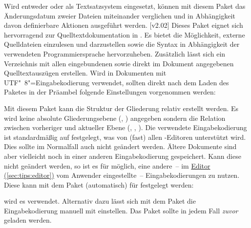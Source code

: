\begin{DeclarePackages}
  Wird entweder  oder  als Textsatzsystem 
  eingesetzt, können mit diesem Paket das Änderungsdatum zweier Dateien 
  miteinander verglichen und in Abhängigkeit davon definierbare Aktionen 
  ausgeführt werden.
[v2.02]
  Dieses Paket eignet sich hervorragend zur Quelltextdokumentation in 
  . Es bietet die Möglichkeit, externe Quelldateien einzulesen 
  und darzustellen sowie die Syntax in Abhängigkeit der verwendeten 
  Programmiersprache hervorzuheben. Zusätzlich lässt sich ein Verzeichnis mit 
  allen eingebundenen sowie direkt im Dokument angegebenen Quelltextauszügen 
  erstellen. Wird  in Dokumenten mit UTF"~8"=Eingabekodierung 
  verwendet, sollten direkt nach dem Laden des Paketes in der Präambel folgende 
  Einstellungen vorgenommen werden:
  \begin{Code}
  \end{Code}\vspace{-\baselineskip}%
  Mit diesem Paket kann die Struktur der Gliederung relativ erstellt werden. 
  Es wird keine absolute Gliederungsebene (, ) 
  angegeben sondern die Relation zwischen vorheriger und aktueller Ebene 
  (, , ).
  Die verwendete Eingabekodierung ist standardmäßig auf 
  festgelegt, was von (fast) allen -Editoren unterstützt wird. 
  Dies sollte im Normalfall auch nicht geändert werden. Ältere Dokumente sind 
  aber vielleicht noch in einer anderen Eingabekodierung gespeichert. Kann 
  diese nicht geändert werden, so ist es für  möglich, eine 
  andere~-- im \hyperref[sec:tips:editor]{Editor (\autoref{sec:tips:editor})} 
  vom Anwender eingestellte~-- Eingabekodierungen zu nutzen. Diese kann mit dem 
  Paket  (automatisch) für  festgelegt 
  werden:
  \begin{Code}
    \usepackage{selinput}
  \end{Code}\vspace{-\baselineskip}%
  wird es verwendet. Alternativ dazu lässt sich mit dem Paket 
   die Eingabekodierung manuell mit 
  einstellen. Das Paket  sollte in jedem Fall \emph{zuvor}
  geladen werden.
\end{DeclarePackages}



